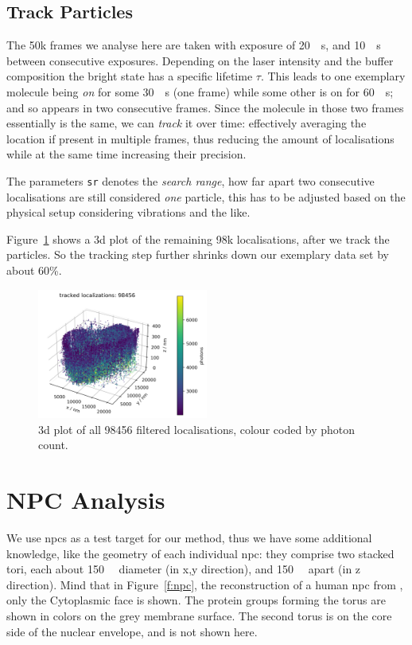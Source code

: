 \documentclass[11pt, a4paper, oneside, twocolumn]{report}
\renewcommand{\tt}{\texttt}
\newcommand{\e}{\emph}
\newcommand{\m}{\mathrm}
\newcommand{\x}[1]{#1\index{#1}}
\begin{document}
\subsection{Track Particles}

The 50k frames we analyse here are taken with exposure of
\SI{20}{\m\s}, and \SI{10}{\m\s} between consecutive
exposures. Depending on the laser intensity and the buffer composition
the bright state has a specific lifetime $\tau$. This leads to one
exemplary molecule being \e{on} for some \SI{30}{\m\s} (one frame)
while some other is on for \SI{60}{\m\s}; and so appears in two
consecutive frames. Since the molecule in those two frames essentially
is the same, we can \e{track} it over time: effectively averaging the
location if present in multiple frames, thus reducing the amount of
localisations while at the same time increasing their precision.

The parameters \tt{sr} denotes the \e{search range}, how far apart two
consecutive localisations are still considered \e{one} particle, this
has to be adjusted based on the physical setup considering vibrations
and the like.

Figure~\ref{f:5_tracking} shows a 3d plot of the remaining 98k
localisations, after we track the particles. So the \x{tracking} step
further shrinks down our exemplary data set by about 60\%.

\begin{figure}[h!]
  \centering
  \includegraphics[width=0.5\textwidth]{5_tracking.png}
  \caption{3d plot of all 98456 filtered localisations, colour coded by
    photon count.}
  \label{f:5_tracking}
\end{figure}


\section{NPC Analysis}\label{s:r:ananpc}

We use \gls{npc}s as a test target for our method, thus we have some
additional knowledge, like the geometry of each individual \gls{npc}:
they comprise two stacked tori, each about \SI{150}{\nano\m} diameter
(in x,y direction), and \SI{150}{\nano\m} apart (in z direction). Mind
that in Figure~\ref{f:npc}, the reconstruction of a human \gls{npc}
from \cite{npc}, only the Cytoplasmic face is shown. The protein
groups forming the torus are shown in colors on the grey membrane
surface. The second torus is on the core side of the nuclear envelope,
and is not shown here.\\
\end{document}
